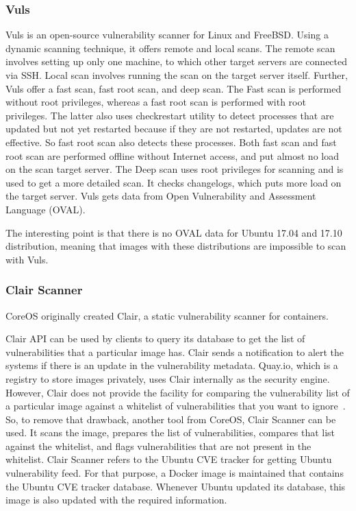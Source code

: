 \documentclass[a4paper,num-refs]{oup-contemporary}
\begin{document}
\subsubsection{Vuls}

Vuls is an open-source vulnerability scanner for Linux and FreeBSD.
Using a dynamic scanning technique, it offers
remote and local scans. The remote scan involves setting up only one machine, to
which other target servers are connected via SSH. Local scan involves running
the scan on the target server itself. Further, Vuls offer a fast scan, fast root scan,
and deep scan.
The Fast scan is performed without root privileges, whereas a fast root scan is
performed with root privileges. The latter also uses checkrestart utility to 
detect processes that are updated but not yet restarted because if they are not
restarted, updates are not effective. So fast root scan also detects these
processes. Both fast scan and fast root scan are performed offline without Internet
access, and put almost no load on the scan target server. The Deep scan uses
root privileges for scanning and is used to get a more detailed scan. It checks
changelogs, which puts more load on the target server.
Vuls gets data from Open Vulnerability and Assessment Language (OVAL).

The interesting point is that there is no OVAL data for Ubuntu 17.04 and 17.10 distribution,
meaning that images with these distributions are impossible to scan with Vuls.



\subsubsection{Clair Scanner}

CoreOS originally created Clair, a static vulnerability scanner for containers. 

Clair API can be used by clients to query its database to get
the list of vulnerabilities that a particular image has. Clair sends a notification
to alert the systems if there is an update in the vulnerability metadata. Quay.io, which
is a registry to store images privately, uses Clair internally as the security engine. However, Clair does not 
provide the facility for comparing
the vulnerability list of a particular image against a whitelist of vulnerabilities that you
want to ignore~\cite{arminc_2019}. 
So, to remove
that drawback, another tool from CoreOS, Clair Scanner can be used. It scans the image, prepares the list of
vulnerabilities, compares that list against the whitelist, and flags vulnerabilities
that are not present in the whitelist.
Clair Scanner refers to the Ubuntu CVE tracker for getting Ubuntu vulnerability feed.
For that purpose, a Docker image is maintained that contains the Ubuntu CVE tracker database.
Whenever Ubuntu updated its database, this image is also updated with the required information.
\end{document}
